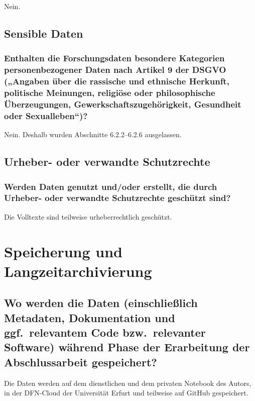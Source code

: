 \documentclass[%
  11pt,
  DIV=16,
  a4paper,
  BCOR=15mm,
  twoside=on,
  bibliography=totoc,
  headings=normal,
  numbers=noendperiod,
]{scrartcl}
\begin{document}
Nein.

\subsection{Sensible Daten}

\subsubsection{Enthalten die Forschungsdaten besondere Kategorien personenbezogener Daten nach Artikel 9 der DSGVO („Angaben über die rassische und ethnische Herkunft, politische Meinungen, religiöse oder philosophische Überzeugungen, Gewerkschaftszugehörigkeit, Gesundheit oder Sexualleben“)?}

Nein. Deshalb wurden Abschnitte 6.2.2–6.2.6 ausgelassen.

\subsection{Urheber- oder verwandte Schutzrechte}

\subsubsection{Werden Daten genutzt und/oder erstellt, die durch Urheber- oder verwandte Schutzrechte geschützt sind?}

Die Volltexte sind teilweise urheberrechtlich geschützt.

\section{Speicherung und Langzeitarchivierung}

\subsection{Wo werden die Daten (einschließlich Metadaten, Dokumentation und ggf.\ relevantem Code bzw.\ relevanter Software) während Phase der Erarbeitung der Abschlussarbeit gespeichert?}

Die Daten werden auf dem dienstlichen und dem privaten Notebook des Autors, in der DFN-Cloud der Universität Erfurt und teilweise auf GitHub gespeichert.
\end{document}
